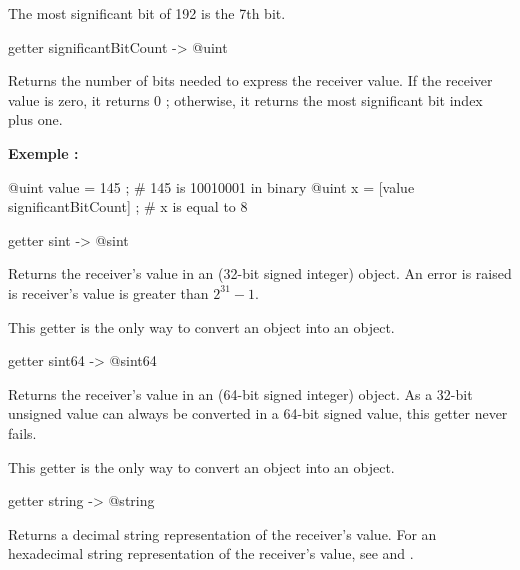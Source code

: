 {The most significant bit of 192 is the 7th bit.





\begin{galgas}
getter significantBitCount -> @uint
\end{galgas}

Returns the number of bits needed to express the receiver value. If the receiver value is zero, it returns 0 ; otherwise, it returns the most significant bit index plus one.

\textbf{Exemple :}
\begin{galgas}
@uint value = 145 ; # 145 is 10010001 in binary
@uint x = [value significantBitCount] ; # x is equal to 8
\end{galgas}







\begin{galgas}
getter sint -> @sint
\end{galgas}

Returns the receiver's value in an  (32-bit signed integer) object. An error is raised is receiver's value is greater than $2^{31}-1$.

This getter is the only way to convert an  object into an  object.





\begin{galgas}
getter sint64 -> @sint64
\end{galgas}

Returns the receiver's value in an  (64-bit signed integer) object. As a 32-bit unsigned value can always be converted in a 64-bit signed value, this getter never fails.

This getter is the only way to convert an  object into an  object.



\begin{galgas}
getter string -> @string
\end{galgas}

Returns a decimal string representation of the receiver's value. For an hexadecimal string representation of the receiver's value, see  and .




}
